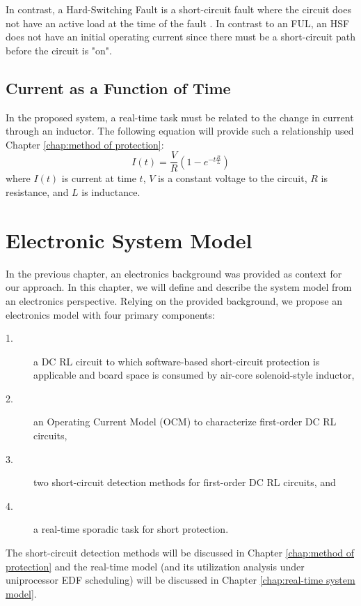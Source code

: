 \documentclass[11pt,oneside]{report}
\begin{document}
    In contrast, a Hard-Switching Fault is a short-circuit fault where the circuit does not have an active load at the time of the fault \cite{hiSpeedProtection}. In contrast to an FUL, an HSF does not have an initial operating current since there must be a short-circuit path before the circuit is "on".
    
    \section*{Current as a Function of Time}
    In the proposed system, a real-time task must be related to the change in current through an inductor. The following equation will provide such a relationship used Chapter \ref{chap:method of protection}:
    \begin{equation}\label{eq:CurrentAtTime}
    I(t) = \frac{V}{R}(1-e^{-t \frac{R}{L}})
    \end{equation}
    where $I(t)$ is current at time $t$, $V$ is a constant voltage to the circuit, $R$ is resistance, and $L$ is inductance.
    \chapter{Electronic System Model}\label{chap:electronic system model}
    In the previous chapter, an electronics background was provided as context for our approach. In this chapter, we will define and describe the system model from an electronics perspective. Relying on the provided background, we propose an electronics model with four primary components:
    \begin{description}
    \item [1.] a DC RL circuit to which software-based short-circuit protection is applicable and board space is consumed by air-core solenoid-style inductor,
    \item [2.] an Operating Current Model (OCM) to characterize first-order DC RL circuits,
    \item [3.] two short-circuit detection methods for first-order DC RL circuits, and
    \item [4.] a real-time sporadic task for short protection.
    \end{description}
    
    The short-circuit detection methods will be discussed in Chapter \ref{chap:method of protection} and the real-time model (and its utilization analysis under uniprocessor EDF scheduling) will be discussed in Chapter \ref{chap:real-time system model}.
    
\end{document}
